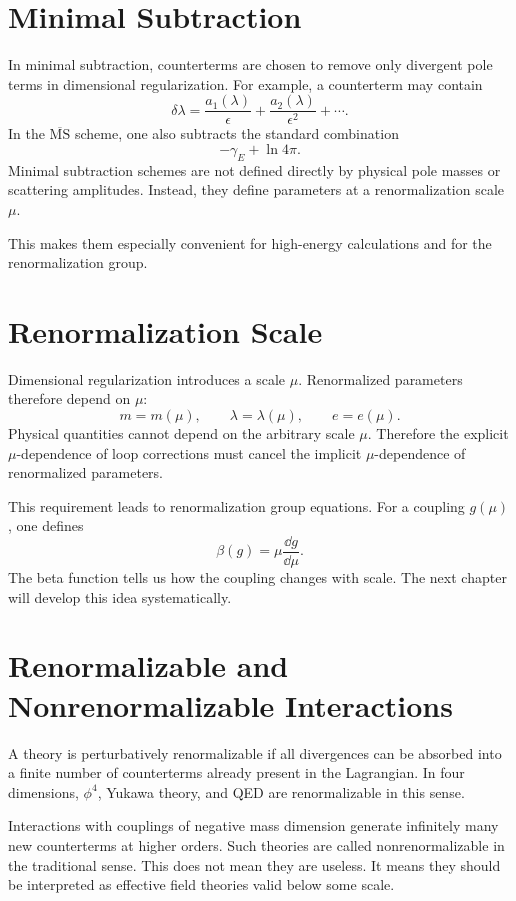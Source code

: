 \section{Minimal Subtraction}

In minimal subtraction, counterterms are chosen to remove only divergent pole
terms in dimensional regularization. For example, a counterterm may contain
\[
    \delta\lambda = \frac{a_1(\lambda)}{\epsilon}+\frac{a_2(\lambda)}{\epsilon^2}+\cdots.
\]
In the \(\overline{\mathrm{MS}}\) scheme, one also subtracts the standard
combination
\[
    -\gamma_E+\ln4\pi.
\]
Minimal subtraction schemes are not defined directly by physical pole masses or
scattering amplitudes. Instead, they define parameters at a renormalization scale
\(\mu\).

This makes them especially convenient for high-energy calculations and for the
renormalization group.

\section{Renormalization Scale}

Dimensional regularization introduces a scale \(\mu\). Renormalized parameters
therefore depend on \(\mu\):
\[
    m=m(\mu),
    \qquad
    \lambda=\lambda(\mu),
    \qquad
    e=e(\mu).
\]
Physical quantities cannot depend on the arbitrary scale \(\mu\). Therefore the
explicit \(\mu\)-dependence of loop corrections must cancel the implicit
\(\mu\)-dependence of renormalized parameters.

This requirement leads to renormalization group equations. For a coupling
\(g(\mu)\), one defines
\[
    \beta(g)=\mu\frac{\dd g}{\dd\mu}.
\]
The beta function tells us how the coupling changes with scale. The next chapter
will develop this idea systematically.

\section{Renormalizable and Nonrenormalizable Interactions}

A theory is perturbatively renormalizable if all divergences can be absorbed
into a finite number of counterterms already present in the Lagrangian. In four
dimensions, \(\phi^4\), Yukawa theory, and QED are renormalizable in this sense.

Interactions with couplings of negative mass dimension generate infinitely many
new counterterms at higher orders. Such theories are called nonrenormalizable in
the traditional sense. This does not mean they are useless. It means they should
be interpreted as effective field theories valid below some scale.

